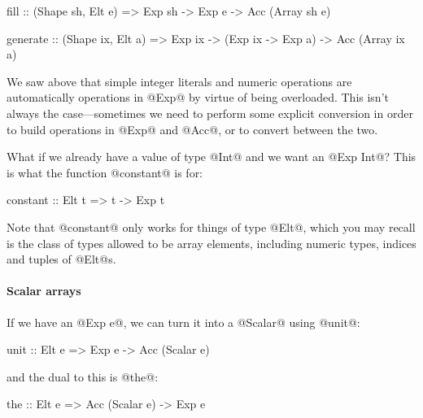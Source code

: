 
\begin{haskell}
fill :: (Shape sh, Elt e)
     => Exp sh -> Exp e
     -> Acc (Array sh e)
\end{haskell}

\begin{haskell}
generate :: (Shape ix, Elt a)
         => Exp ix -> (Exp ix -> Exp a)
         -> Acc (Array ix a)
\end{haskell}


We saw above that simple integer literals and numeric operations are
automatically operations in @Exp@ by virtue of being overloaded.  This
isn't always the case---sometimes we need to perform some explicit
conversion in order to build operations in @Exp@ and @Acc@, or to
convert between the two.

What if we already have a value of type @Int@ and we want an @Exp Int@?
This is what the function @constant@ is for:

\begin{haskell}
constant :: Elt t => t -> Exp t
\end{haskell}

\noindent Note that @constant@ only works for things of type @Elt@,
which you may recall is the class of types allowed to be array
elements, including numeric types, indices and tuples of @Elt@s.

\paragraph{Scalar arrays}

If we have an @Exp e@, we can turn it into a @Scalar@ using @unit@:

\begin{haskell}
unit :: Elt e => Exp e -> Acc (Scalar e)
\end{haskell}

\noindent and the dual to this is @the@:

\begin{haskell}
the :: Elt e => Acc (Scalar e) -> Exp e
\end{haskell}



% 
% 



